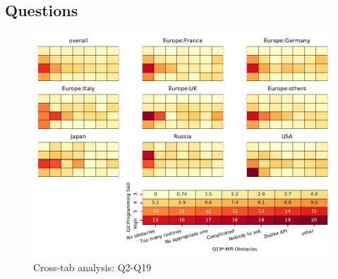 
\subsection{Questions}


\begin{figure}
\begin{center}
\includegraphics[width=12cm]{../pdfs/Q2-Q19.pdf}
\caption{Cross-tab analysis: Q2-Q19}
\label{fig:Q2-Q19}
\end{center}
\end{figure}
